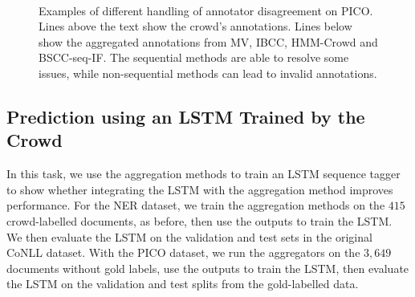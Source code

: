 \begin{figure}
{}\\
\caption{Examples of different handling of annotator disagreement on PICO. 
Lines above the text show the crowd's annotations. Lines below show the aggregated annotations from MV, IBCC, HMM-Crowd and BSCC-seq-IF.
The sequential methods are able to resolve some issues, 
while non-sequential methods can lead to invalid annotations. }
\label{fig:disagreements}
\end{figure}

\subsection{Prediction using an LSTM Trained by the Crowd}\label{sec:task2}

In this task, we use the aggregation methods to train an LSTM sequence tagger \cite{lample2016}
to show whether integrating the LSTM with the aggregation method improves performance.
For the NER dataset, we train the aggregation methods on the $415$ crowd-labelled documents, as before,
then use the outputs to train the LSTM. We then evaluate the LSTM on the validation and test sets
in the original CoNLL dataset.
With the PICO dataset, we run the aggregators on the $3,649$ documents without gold labels, 
use the outputs to train the LSTM, then evaluate the LSTM on the validation and test splits from the gold-labelled data.


